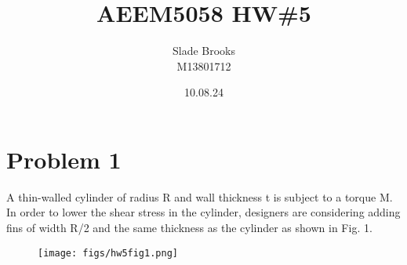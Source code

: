 \documentclass[12 pt]{article}
\title{AEEM5058 HW\#5}
\date{10.08.24}
\author{Slade Brooks \\ M13801712}
\begin{document}
\maketitle

\section*{Problem 1}
A thin-walled cylinder of radius R and wall thickness t is subject to a torque M. In order to lower
the shear stress in the cylinder, designers are considering adding fins of width R/2 and the same
thickness as the cylinder as shown in Fig. 1.
\begin{figure}[!hbtp]
    \centering
    \texttt{[image: figs/hw5fig1.png]}
\end{figure} \par
\pagebreak
\end{document}
